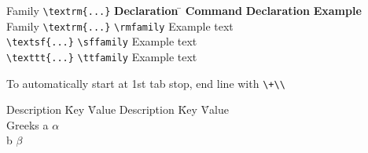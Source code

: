\documentclass{article}
\newcommand{\head}[1]{\textbf{#1}}
\begin{document}
\begin{tabbing}
Family \= \verb|\textrm{...}| \= \head{Declaration} \= \kill
\> \head{Command} \> \head{Declaration} \> \head{Example}\\
Family
  \> \verb|\textrm{...}| \> \verb|\rmfamily| \> \rmfamily Example text\\
  \> \verb|\textsf{...}| \> \verb|\sffamily| \> \sffamily Example text\\
  \> \verb|\texttt{...}| \> \verb|\ttfamily| \> \ttfamily Example text\\
\end{tabbing}

To automatically start at 1st tab stop, end line with \verb|\+\\|

\begin{tabbing}
Description \= Key \= Value \kill
Description \= Key \= Value  \\
Greeks \> a  \> $\alpha$ \+\\
b \> $\beta$
\end{tabbing}
\end{document}
